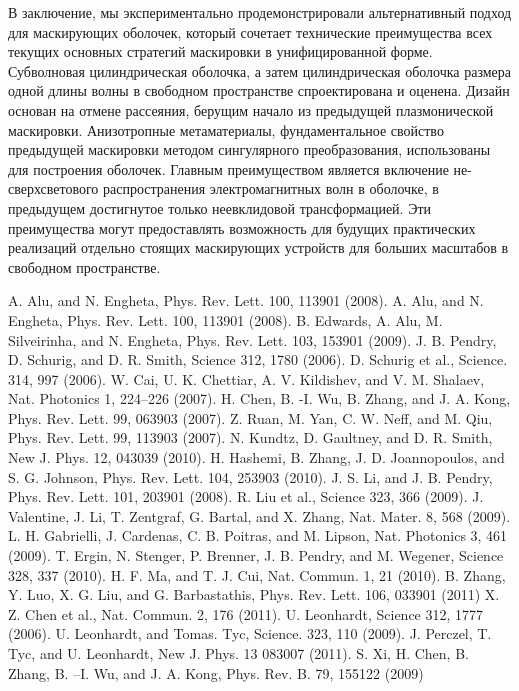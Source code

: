 \documentclass[a4paper, 12pt]{article}
\begin{document}
В заключение, мы экспериментально продемонстрировали альтернативный подход
для маскирующих оболочек, который сочетает технические преимущества всех
текущих основных стратегий маскировки в унифицированной форме. Субволновая
цилиндрическая оболочка, а затем цилиндрическая оболочка размера одной длины
волны в свободном пространстве спроектирована и оценена. Дизайн основан
на отмене рассеяния, берущим начало из предыдущей плазмонической маскировки.
Анизотропные метаматериалы, фундаментальное свойство предыдущей маскировки
методом сингулярного преобразования, использованы для построения оболочек.
Главным преимуществом является включение не-сверхсветового распространения
электромагнитных волн в оболочке, в предыдущем достигнутое только неевклидовой
трансформацией. Эти преимущества могут предоставлять возможность для будущих
практических реализаций отдельно стоящих маскирующих устройств для больших
масштабов в свободном пространстве.

\begin{thebibliography}{22}

 A. Alu, and N. Engheta, Phys. Rev. Lett. 100, 113901 (2008).
 A. Alu, and N. Engheta, Phys. Rev. Lett. 100, 113901 (2008).
 B. Edwards, A. Alu, M. Silveirinha, and N. Engheta, 
Phys. Rev. Lett. 103, 153901 (2009).
 J. B. Pendry, D. Schurig, and D. R. Smith, 
Science 312, 1780 (2006).
 D. Schurig et al., Science. 314, 997 (2006).
 W. Cai, U. K. Chettiar, A. V. Kildishev, and V. M. Shalaev, 
Nat. Photonics 1, 224–226 (2007).
 H. Chen, B. -I. Wu, B. Zhang, and J. A. Kong, 
Phys. Rev. Lett. 99, 063903 (2007).
 Z. Ruan, M. Yan, C. W. Neff, and M. Qiu, 
Phys. Rev. Lett. 99, 113903 (2007).
 N. Kundtz, D. Gaultney, and D. R. Smith, 
New J. Phys. 12, 043039 (2010).
 H. Hashemi, B. Zhang, J. D. Joannopoulos, and S. G. Johnson, 
Phys. Rev. Lett. 104, 253903 (2010).
 J. S. Li, and J. B. Pendry, Phys. Rev. Lett. 101, 203901 (2008).
 R. Liu et al., Science 323, 366 (2009).
 J. Valentine, J. Li, T. Zentgraf, G. Bartal, and X. Zhang, 
Nat. Mater. 8, 568 (2009).
 L. H. Gabrielli, J. Cardenas, C. B. Poitras, and M. Lipson, 
Nat. Photonics 3, 461 (2009).
 T. Ergin, N. Stenger, P. Brenner, J. B. Pendry, and M. Wegener, 
Science 328, 337 (2010).
 H. F. Ma, and T. J. Cui, Nat. Commun. 1, 21 (2010).
 B. Zhang, Y. Luo, X. G. Liu, and G. Barbastathis, 
Phys. Rev. Lett. 106, 033901 (2011)
 X. Z. Chen et al., Nat. Commun. 2, 176 (2011).
 U. Leonhardt, Science 312, 1777 (2006).
 U. Leonhardt, and Tomas. Tyc, Science. 323, 110 (2009).
 J. Perczel, T. Tyc, and U. Leonhardt, 
New J. Phys. 13 083007 (2011).
 S. Xi, H. Chen, B. Zhang, B. –I. Wu, and J. A. Kong, 
Phys. Rev. B. 79, 155122 (2009)

\end{thebibliography}
\end{document}
